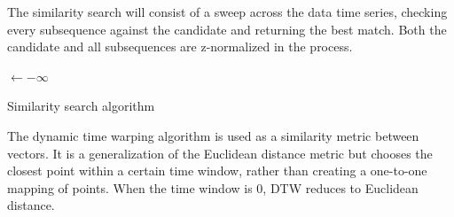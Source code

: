 The similarity search will consist of a sweep across the data time series, checking every subsequence against the candidate and returning the best match.
Both the candidate and all subsequences are z-normalized in the process.
\begin{algorithm}[h]




 \Best$\leftarrow -\infty$\;
 \caption{Similarity search algorithm}
\end{algorithm}

The dynamic time warping algorithm is used as a similarity metric between vectors. It is a generalization of the Euclidean distance metric but chooses the closest point within a certain time window, rather than creating a one-to-one mapping of points. When the time window is 0, DTW reduces to Euclidean distance.

